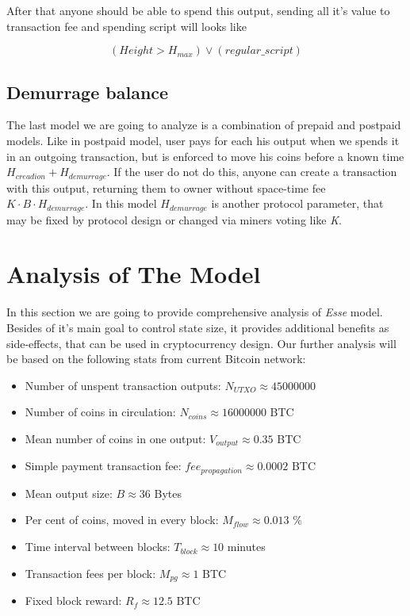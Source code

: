 \documentclass[]{article}   %
\newcommand{\esse}{\textit{Esse}}
\begin{document}
After that anyone should be able to spend this output, sending all it's value to transaction fee and spending script will looks like

\begin{equation}
(Height > H_{max}) \lor (regular\_script)
\end{equation}

\subsection{Demurrage balance}

The last model we are going to analyze is a combination of prepaid and postpaid models. Like in postpaid model, user pays for each his output when we spends it in an outgoing transaction, but is enforced to move his coins before a known time $H_{creadion} + H_{demurrage}$. If the user do not do this, anyone can create a transaction with this output, returning them to owner without space-time fee ${K \cdot B \cdot H_{demurrage}}$. In this model $H_{demurrage}$ is another protocol parameter, that may be fixed by protocol design or changed via miners voting like \textit{K}.

\section{Analysis of The Model}
\label{sec:analysis}

In this section we are going to provide comprehensive analysis of \esse{} model. Besides of it's main goal to control state size, it provides additional benefits as side-effects, that can be used in cryptocurrency design. Our further analysis will be based on the following stats from current Bitcoin network:

\begin{itemize}
  \item Number of unspent transaction outputs: $N_{UTXO} \approx 45000000$
  \item Number of coins in circulation: $N_{coins} \approx 16000000$ BTC
  \item Mean number of coins in one output: $V_{output} \approx 0.35$ BTC
  \item Simple payment transaction fee: $fee_{propagation} \approx 0.0002$ BTC
  \item Mean output size: $B \approx 36$ Bytes
  \item Per cent of coins, moved in every block: $M_{flow} \approx 0.013$ \%
  \item Time interval between blocks: $T_{block} \approx 10$ minutes
  \item Transaction fees per block: $M_{pg} \approx 1$ BTC
  \item Fixed block reward: $R_{f} \approx 12.5$ BTC
\end{itemize}
\end{document}
